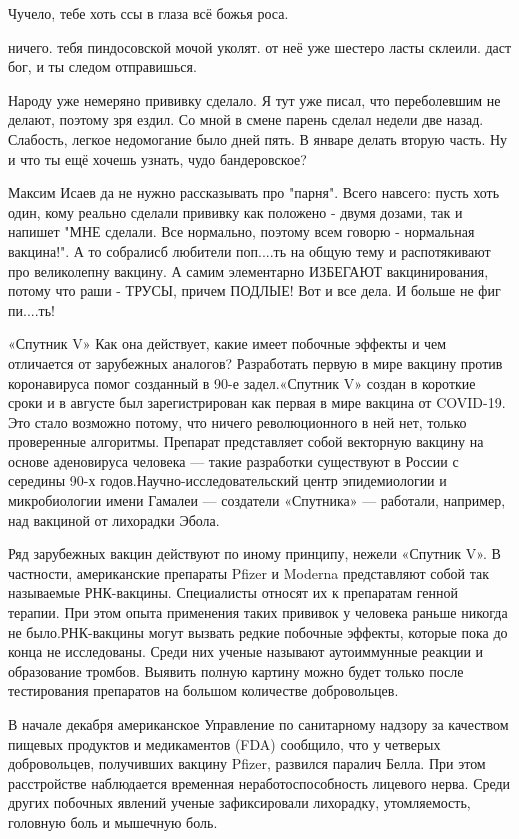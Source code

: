 \begin{itemize}
Чучело, тебе хоть ссы в глаза всё божья роса.

ничего. тебя пиндосовской мочой уколят. от неё уже шестеро ласты склеили. даст
бог, и ты следом отправишься.

Народу уже немеряно прививку сделало. Я тут уже писал, что переболевшим не
делают, поэтому зря ездил. Со мной в смене парень сделал недели две назад.
Слабость, легкое недомогание было дней пять. В январе делать вторую часть. Ну и
что ты ещё хочешь узнать, чудо бандеровское?

Максим Исаев да не нужно рассказывать про "парня". Всего навсего: пусть хоть
один, кому реально сделали прививку как положено - двумя дозами, так и напишет
"МНЕ сделали. Все нормально, поэтому всем говорю - нормальная вакцина!". А то
собралисб любители поп....ть на общую тему и распотякивают про великолепну
вакцину. А самим элементарно ИЗБЕГАЮТ вакцинирования, потому что раши - ТРУСЫ,
причем ПОДЛЫЕ! Вот и все дела. И больше не фиг пи....ть!


«Спутник V» Как она действует, какие имеет побочные эффекты и чем отличается от
зарубежных аналогов? Разработать первую в мире вакцину против коронавируса
помог созданный в 90-е задел.«Спутник V» создан в короткие сроки и в августе
был зарегистрирован как первая в мире вакцина от COVID-19. Это стало возможно
потому, что ничего революционного в ней нет, только проверенные алгоритмы.
Препарат представляет собой векторную вакцину на основе аденовируса человека —
такие разработки существуют в России с середины 90-х
годов.Научно-исследовательский центр эпидемиологии и микробиологии имени
Гамалеи — создатели «Спутника» — работали, например, над вакциной от лихорадки
Эбола.


Ряд зарубежных вакцин действуют по иному принципу, нежели «Спутник V». В
частности, американские препараты Pfizer и Moderna представляют собой так
называемые РНК-вакцины. Специалисты относят их к препаратам генной терапии. При
этом опыта применения таких прививок у человека раньше никогда не
было.РНК-вакцины могут вызвать редкие побочные эффекты, которые пока до конца
не исследованы. Среди них ученые называют аутоиммунные реакции и образование
тромбов. Выявить полную картину можно будет только после тестирования
препаратов на большом количестве добровольцев.


В начале декабря американское Управление по санитарному надзору за качеством
пищевых продуктов и медикаментов (FDA) сообщило, что у четверых добровольцев,
получивших вакцину Pfizer, развился паралич Белла. При этом расстройстве
наблюдается временная неработоспособность лицевого нерва. Среди других побочных
явлений ученые зафиксировали лихорадку, утомляемость, головную боль и мышечную
боль.

\end{itemize}
